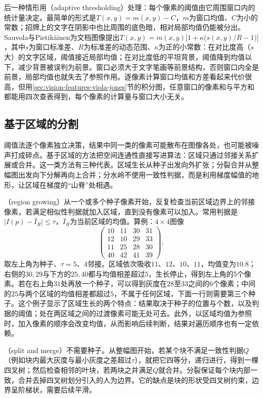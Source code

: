 后一种情形用（adaptive thresholding）处理：每个像素的阈值由它周围窗口内的统计量决定。最简单的形式是$T(x,y)=m(x,y)-C$，$m$为窗口均值、$C$为小的常数；招牌上的文字在阴影中也比周围的底色暗，相对局部均值仍能被分出。Sauvola与Pietikäinen为文档图像提出$T(x,y)=m(x,y)\bigl[1+\kappa\bigl(s(x,y)/R-1\bigr)\bigr]$，其中$s$为窗口标准差、$R$为标准差的动态范围、$\kappa$为正的小常数：在对比度高（$s$大）的文字区域，阈值接近局部均值；在对比度低的平坦背景，阈值降到均值以下，减少背景被误判为前景。窗口必须大于文字笔画等前景结构，否则窗口内全是前景，局部均值也就失去了参照作用。逐像素计算窗口均值和方差看起来代价很高，但用\ref{sec:vision-features-viola-jones}节的积分图，任意窗口的像素和与平方和都能用四次查表得到，每个像素的计算量与窗口大小无关。

\subsection{基于区域的分割}
\label{sec:vision-features-region-segmentation}
\label{sec:vision-features-watershed}

阈值法逐个像素独立决策，结果中同一类的像素可能散布在图像各处，也可能被噪声打成碎点。基于区域的方法把空间连通性直接写进算法：区域只通过邻接关系扩展或合并。这一类方法有三种代表。区域生长从种子出发向外扩张；分裂合并从整幅图出发向下分解再向上合并；分水岭不使用一致性判据，而是利用梯度幅值的地形，让区域在梯度的“山脊”处相遇。

（region growing）从一个或多个种子像素开始，反复检查当前区域边界上的邻接像素，若满足相似性判据就加入区域，直到没有像素可以加入。常用判据是$\lvert I(p)-\bar I_R\rvert\leq\tau$，$\bar I_R$为当前区域的均值。算例：$4\times4$图像
\[
  \begin{pmatrix}10&11&30&31\\12&10&29&33\\11&25&28&30\\40&42&41&39\end{pmatrix},
\]
取左上角为种子、$\tau=5$、4邻接。区域依次吸收$11$、$12$、$10$、$11$，均值变为$10.8$；右侧的$30,29$与下方的$25,40$都与均值相差超过$5$，生长停止，得到左上角的5个像素。若在右上角$31$处再放一个种子，可以得到灰度在$28$至$33$之间的6个像素；中间的$25$与两个区域的均值相差都超过$5$，不属于任何区域，下面一行则需要第三个种子。这个例子显示了区域生长的两个特点：结果取决于种子的位置与个数，以及判据的阈值；处在两区域之间的过渡像素可能无处可去。此外，以区域均值为参照时，加入像素的顺序会改变均值，从而影响后续判断，结果对遍历顺序也有一定依赖。

（split and merge）不需要种子。从整幅图开始，若某个块不满足一致性判据$Q$（例如块内最大灰度与最小灰度之差超过$\tau$），就把它四等分，递归进行，得到一棵四叉树；然后检查相邻的叶块，若两块之并满足$Q$就合并。分裂保证每个块内部一致，合并去掉四叉树划分引入的人为边界。它的缺点是块的形状受四叉树约束，边界呈阶梯状，需要后续平滑。

